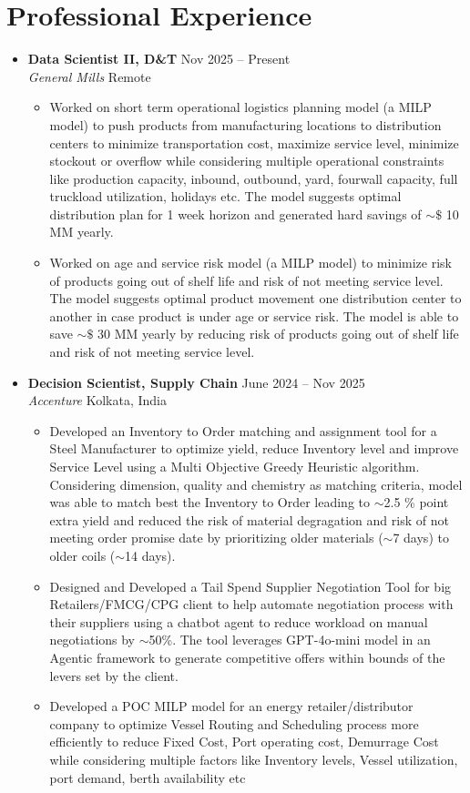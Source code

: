 \documentclass[a4paper,10pt]{article}
\newcommand{\resumeItem}[1]{\item\small{#1}}
\newcommand{\resumeSubheading}[4]{
  \vspace{1pt}\item
    \textbf{#1} \hfill {#2} \\
    \emph{#3} \hfill {#4} \\
}
\begin{document}
\section*{Professional Experience}
\begin{itemize}
    \resumeSubheading
      {Data Scientist II, D\&T}{Nov 2025 -- Present}
      {General Mills}{Remote}
      \begin{itemize}
          \resumeItem{
            Worked on short term operational logistics planning model (a MILP model) to push products from manufacturing locations to distribution centers 
            to minimize transportation cost, maximize service level, minimize stockout or overflow while considering multiple operational constraints 
            like production capacity, inbound, outbound, yard, fourwall capacity, full truckload utilization, holidays etc. The model suggests optimal
            distribution plan for 1 week horizon and generated hard savings of $ \sim\$ $ 10 MM yearly.
          }
          \resumeItem{
            Worked on age and service risk model (a MILP model) to minimize risk of products going out of shelf life and risk of not meeting service level. 
            The model suggests optimal product movement one distribution center to another in case product is under age or service risk. The model is able
            to save $ \sim\$ $ 30 MM yearly by reducing risk of products going out of shelf life and risk of not meeting service level.
          }
      \end{itemize}

    \resumeSubheading
      {Decision Scientist, Supply Chain}{June 2024 -- Nov 2025}
      {Accenture}{Kolkata, India}
      \begin{itemize}
          \resumeItem{
            Developed an Inventory to Order matching and assignment tool for a Steel Manufacturer to optimize yield, 
            reduce Inventory level and improve Service Level using a Multi Objective Greedy Heuristic algorithm.
            Considering dimension, quality and chemistry as matching criteria, model was able to match best the Inventory to Order 
            leading to $\sim$2.5 \% point extra yield and reduced the risk of material 
            degragation and risk of not meeting order promise date by prioritizing older materials ($\sim$7 days) 
            to older coils ($\sim$14 days).
          }
          \resumeItem{
            Designed and Developed a Tail Spend Supplier Negotiation Tool for big Retailers/FMCG/CPG client to help automate negotiation
            process with their suppliers using a chatbot agent to reduce workload on manual negotiations by $\sim$50\%. The tool leverages
            GPT-4o-mini model in an Agentic framework to generate competitive offers within bounds of the levers set by the client. 
          }
          \resumeItem{
            Developed a POC MILP model for an energy retailer/distributor company to optimize Vessel Routing and 
            Scheduling process more efficiently to reduce Fixed Cost, Port operating cost, Demurrage Cost while
            considering multiple factors like Inventory levels, Vessel utilization, port demand, berth availability etc
          }
      \end{itemize}


\end{itemize}
\end{document}
